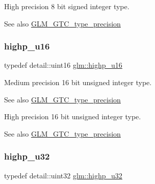 High precision 8 bit signed integer type. \begin{DoxySeeAlso}{See also}
\hyperlink{group__gtc__type__precision}{G\+L\+M\+\_\+\+G\+T\+C\+\_\+type\+\_\+precision} 
\end{DoxySeeAlso}
\mbox{\label{group__gtc__type__precision_ga9da2178d7501d9c0f225fa1a7b70cb45}} 
\subsubsection{\texorpdfstring{highp\+\_\+u16}{highp\_u16}}
{\footnotesize\ttfamily typedef detail\+::uint16 \hyperlink{group__gtc__type__precision_ga9da2178d7501d9c0f225fa1a7b70cb45}{glm\+::highp\+\_\+u16}}

Medium precision 16 bit unsigned integer type. \begin{DoxySeeAlso}{See also}
\hyperlink{group__gtc__type__precision}{G\+L\+M\+\_\+\+G\+T\+C\+\_\+type\+\_\+precision}
\end{DoxySeeAlso}
High precision 16 bit unsigned integer type. \begin{DoxySeeAlso}{See also}
\hyperlink{group__gtc__type__precision}{G\+L\+M\+\_\+\+G\+T\+C\+\_\+type\+\_\+precision} 
\end{DoxySeeAlso}
\mbox{\label{group__gtc__type__precision_gae8e8a2c712653891a03c171795286ac5}} 
\subsubsection{\texorpdfstring{highp\+\_\+u32}{highp\_u32}}
{\footnotesize\ttfamily typedef detail\+::uint32 \hyperlink{group__gtc__type__precision_gae8e8a2c712653891a03c171795286ac5}{glm\+::highp\+\_\+u32}}

